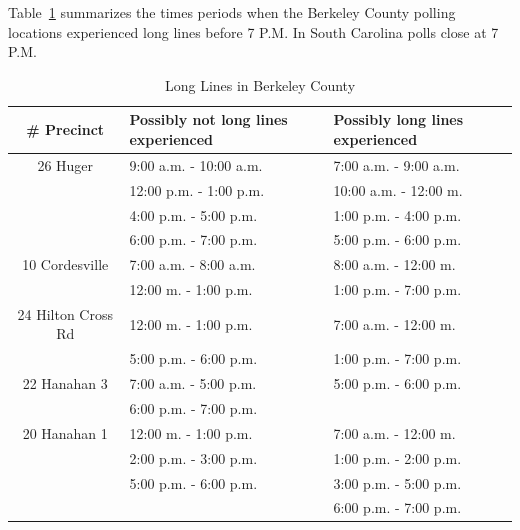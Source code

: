 Table~\ref{tab:line} summarizes the times periods when the Berkeley County polling locations experienced long lines before 7 P.M.  In South Carolina polls close at 7 P.M.

\begin{table}
    \begin{center}
    \begin{tabular}{| c | p{5cm} | p{4.5cm} |}
    \hline                   
    \# Precinct & Possibly not long lines experienced &Possibly long lines experienced\\
    \hline
    26 Huger&9:00 a.m. - 10:00 a.m. &7:00 a.m. - 9:00 a.m.\\
            &12:00 p.m. - 1:00 p.m. &10:00 a.m. - 12:00 m.\\
            &4:00 p.m. - 5:00 p.m. &1:00 p.m. - 4:00 p.m.\\
            &6:00 p.m. - 7:00 p.m. &5:00 p.m. - 6:00 p.m.\\
    \hline
    10 Cordesville &7:00 a.m. - 8:00 a.m.&8:00 a.m. - 12:00 m.\\
                   &12:00 m. - 1:00 p.m.&1:00 p.m. - 7:00 p.m.\\
    \hline  
    24 Hilton Cross Rd &12:00 m. - 1:00 p.m. &7:00 a.m. - 12:00 m.\\
                       &5:00 p.m. - 6:00 p.m. &1:00 p.m. - 7:00 p.m.\\
    \hline
    22 Hanahan 3 &7:00 a.m. - 5:00 p.m. &5:00 p.m. - 6:00 p.m.\\
                 &6:00 p.m. - 7:00 p.m.&\\
    \hline
    20 Hanahan 1 &12:00 m. - 1:00 p.m. &7:00 a.m. - 12:00 m.\\
                 &2:00 p.m. - 3:00 p.m. &1:00 p.m. - 2:00 p.m.\\
                 &5:00 p.m. - 6:00 p.m. &3:00 p.m. - 5:00 p.m.\\
                 &                      &6:00 p.m. - 7:00 p.m.\\
    \hline
    \end{tabular}
    \end{center}
    \caption{Long Lines in Berkeley County}
    \label{tab:line}
\end{table}




